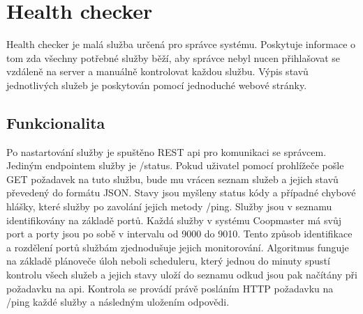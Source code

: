 \section{Health checker}\label{sec:health-checker}
Health checker je malá služba určená pro správce systému.
Poskytuje informace o tom zda všechny potřebné služby běží, aby správce nebyl nucen přihlašovat se vzdáleně na server a manuálně kontrolovat každou službu.
Výpis stavů jednotlivých služeb je poskytován pomocí jednoduché webové stránky.

\subsection*{Funkcionalita}
Po nastartování služby je spuštěno REST api pro komunikaci se správcem.
Jediným endpointem služby je /status.
Pokud uživatel pomocí prohlížeče pošle GET požadavek na tuto službu, bude mu vrácen seznam služeb a jejich stavů převedený do formátu JSON.
Stavy jsou myšleny status kódy a případné chybové hlášky, které služby po zavolání jejich metody /ping.
Služby jsou v seznamu identifikovány na základě portů.
Každá služby v systému Coopmaster má svůj port a porty jsou po sobě v intervalu od 9000 do 9010.
Tento způsob identifikace a rozdělení portů službám zjednodušuje jejich monitorování.
Algoritmus funguje na základě plánoveče úloh neboli scheduleru, který jednou do minuty spustí kontrolu všech služeb a jejich stavy uloží do seznamu odkud jsou pak načítány při požadavku na api.
Kontrola se provádí právě posláním HTTP požadavku na /ping každé služby a následným uložením odpovědi.

